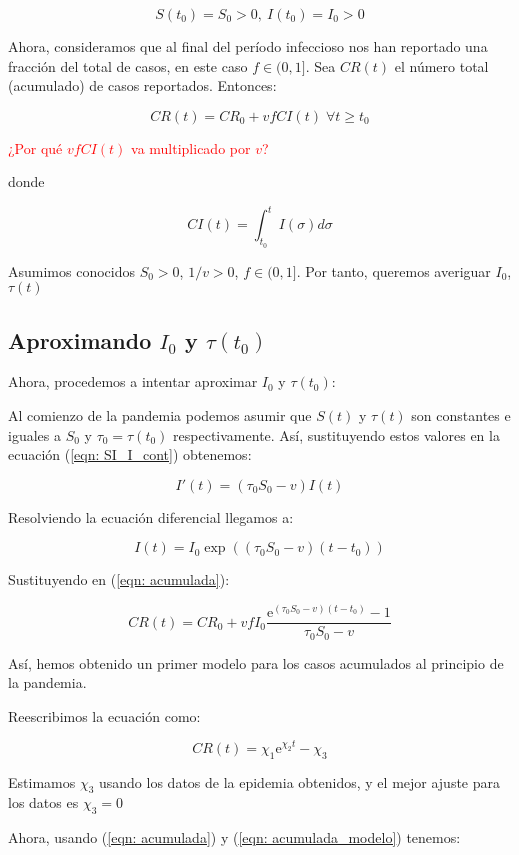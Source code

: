 $$S(t_0)=S_0>0, \: I(t_0)=I_0>0$$

Ahora, consideramos que al final del período infeccioso nos han reportado una fracción del total de casos, en este caso $f\in (0,1]$. Sea $CR(t)$ el número total (acumulado) de casos reportados. Entonces:

\begin{equation}
\label{eqn: acumulada}
CR(t) = CR_0 + vfCI(t) \; \forall t \geq t_0
\end{equation}

\textcolor{red}{¿Por qué $vfCI(t)$ va multiplicado por $v$?}

donde

$$CI(t) = \int_{t_0}^t I(\sigma ) d\sigma $$

Asumimos conocidos $S_0 > 0$, $1/v>0$, $f\in (0,1]$. Por tanto, queremos averiguar $I_0$, $\tau (t)$

\subsection{Aproximando $I_0$ y $\tau (t_0)$}
Ahora, procedemos a intentar aproximar $I_0$ y $\tau (t_0)$:

Al comienzo de la pandemia podemos asumir que $S(t)$ y $\tau (t)$ son constantes e iguales a $S_0$ y $\tau_0 = \tau (t_0)$ respectivamente. Así, sustituyendo estos valores en la ecuación (\ref{eqn: SI_I_cont}) obtenemos:

$$I'(t) = (\tau_0 S_0 -v) I(t)$$

Resolviendo la ecuación diferencial llegamos a:

$$I(t) = I_0\exp{((\tau_0 S_0-v)(t-t_0))}$$

Sustituyendo en (\ref{eqn: acumulada}):

$$CR(t) = CR_0 + vfI_0\frac{\mathrm{e}^{(\tau_0 S_0 -v)(t-t_0)} -1}{\tau_0 S_0-v}$$

Así, hemos obtenido un primer modelo para los casos acumulados al principio de la pandemia.

Reescribimos la ecuación como:

\begin{equation}
\label{eqn: acumulada_modelo}
CR(t) = \chi_1 \mathrm{e}^{\chi_2 t} -\chi_3
\end{equation}

Estimamos $\chi_3$ usando los datos de la epidemia obtenidos, y el mejor ajuste para los datos es $\chi_3=0$

Ahora, usando (\ref{eqn: acumulada}) y (\ref{eqn: acumulada_modelo}) tenemos:

